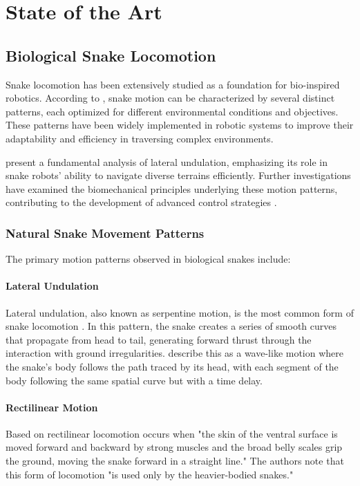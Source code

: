 \documentclass[12pt,a4paper]{report}
\begin{document}
\chapter{State of the Art}

\section{Biological Snake Locomotion}
Snake locomotion has been extensively studied as a foundation for bio-inspired robotics. According to \textcite{liljeback-2013}, snake motion can be characterized by several distinct patterns, each optimized for different environmental conditions and objectives. These patterns have been widely implemented in robotic systems to improve their adaptability and efficiency in traversing complex environments.

\textcite{liljeback-2013} present a fundamental analysis of lateral undulation, emphasizing its role in snake robots' ability to navigate diverse terrains efficiently. Further investigations have examined the biomechanical principles underlying these motion patterns, contributing to the development of advanced control strategies \textcite{lamping-2022}.

\subsection{Natural Snake Movement Patterns}
The primary motion patterns observed in biological snakes include:

\subsubsection{Lateral Undulation}
Lateral undulation, also known as serpentine motion, is the most common form of snake locomotion \textcite{liljeback-2013}. In this pattern, the snake creates a series of smooth curves that propagate from head to tail, generating forward thrust through the interaction with ground irregularities. \textcite{liljeback-2013} describe this as a wave-like motion where the snake's body follows the path traced by its head, with each segment of the body following the same spatial curve but with a time delay. 

\subsubsection{Rectilinear Motion}
Based on \textcite{Zhenli2006} rectilinear locomotion occurs when "the skin of the ventral surface is moved forward and backward by strong muscles and the broad belly scales grip the ground, moving the snake forward in a straight line." The authors note that this form of locomotion "is used only by the heavier-bodied snakes."
\end{document}
